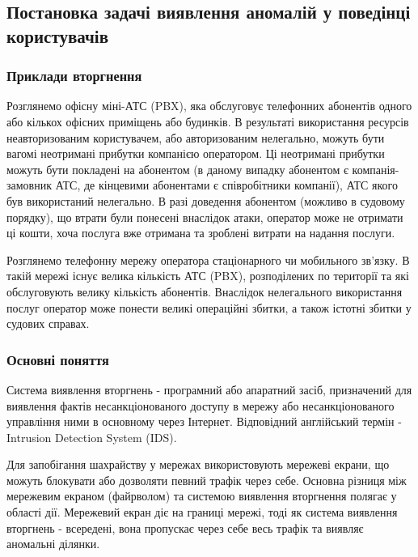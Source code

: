 
\subsection{Постановка задачі виявлення аномалій у поведінці користувачів}

\subsubsection{Приклади вторгнення}

  Розглянемо офісну міні-АТС (PBX), яка обслуговує телефонних абонентів одного або кількох офісних приміщень або будинків. В результаті використання ресурсів неавторизованим користувачем, або авторизованим нелегально, можуть бути вагомі неотримані прибутки компанією оператором. Ці неотримані прибутки можуть бути покладені на абонентом (в даному випадку абонентом є компанія-замовник АТС, де кінцевими абонентами є співробітники компанії), АТС якого був використаний нелегально. В разі доведення абонентом (можливо в судовому порядку), що втрати були понесені внаслідок атаки, оператор може не отримати ці кошти, хоча послуга вже отримана та зроблені витрати на надання послуги.

  Розглянемо телефонну мережу оператора стаціонарного чи мобильного зв'язку. В такій мережі існує велика кількість АТС (PBX), розподілених по території та які обслуговують велику кількість абонентів. Внаслідок нелегального використання послуг оператор може понести великі операційні збитки, а також істотні збитки у судових справах.

\subsubsection{Основні поняття}

  Система виявлення вторгнень - програмний або апаратний засіб, призначений для виявлення фактів несанкціонованого доступу в мережу або несанкціонованого управління ними в основному через Інтернет. Відповідний англійський термін - Intrusion Detection System (IDS).

  Для запобігання шахрайству у мережах використовують мережеві екрани, що можуть блокувати або дозволяти певний трафік через себе.
  Основна різниця між мережевим екраном (файрволом) та системою виявлення вторгнення полягає у області дії. Мережевий екран діє на границі мережі, тоді як система виявлення вторгнень - всередені, вона пропускає через себе весь трафік та виявляє аномальні ділянки.

